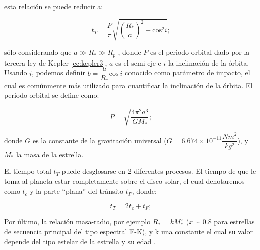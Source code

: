 esta relación se puede reducir a:

\begin{equation}
\label{ec:tiempoTransitoReduc}
\displaystyle t_{T}=\dfrac{P}{\pi}\sqrt{\left(\dfrac{R_{*}}{a} \right)^{2}- \mbox{cos}^{2}i};
\end{equation}

\noindent sólo considerando que $a\gg R_{*}\gg R_{p}$ \citep{winn2010transits}, donde $P$ es el periodo orbital dado por la tercera ley de Kepler \ref{ec:kepler3}, $a$ es el semi-eje e $i$ la inclinación de la órbita. Usando $i$, podemos definir $b=\dfrac{a}{R_{*}}\mbox{cos}~i$ conocido como parámetro de impacto, el cual es comúnmente más utilizado para cuantificar la inclinación de la órbita. El periodo orbital se define como:

\begin{equation}
  \label{ec:kepler3}
  \displaystyle P=\sqrt{\dfrac{4\pi^{2}a^{3}}{GM_{*}}};
  \end{equation} 
  
\noindent donde $G$ es la constante de la gravitación universal ($G=6.674\times 10^{-11}\dfrac{Nm^{2}}{kg^{2}}$), y $M_{*}$ la masa de la estrella.

El tiempo total $t_{T}$ puede desglosarse en 2 diferentes procesos. El tiempo de que le toma al planeta estar completamente sobre el disco solar, el cual denotaremos como $t_{c}$ y la parte ``plana'' del tránsito $t_{F}$, donde:

\begin{equation}
  \label{ec:tiempoTransitoReduc}
  \displaystyle t_{T}=2t_{c}+t_{F};
\end{equation}

Por último, la relación masa-radio, por ejemplo $R_{*}=kM_{*}^{x}$ ($x\sim 0.8$ para estrellas de secuencia principal del tipo espectral F-K), y k una constante el cual su valor depende del tipo estelar de la estrella y su edad \citep{allen2001allen}.


